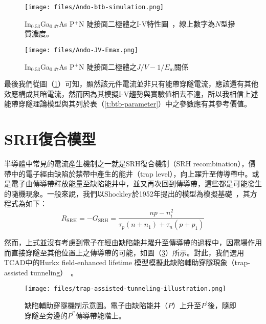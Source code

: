 \begin{figure}[h]
\centering
\texttt{[image: files/Ando-btb-simulation.png]}
\caption[In$_{0.53}$Ga$_{0.47}$As P$^+$N 陡接面二極體之I-V關係]{In$_{0.53}$Ga$_{0.47}$As P$^+$N 陡接面二極體之I-V特性圖~\cite{Ando:1980fn}，線上數字為$N$型摻質濃度。}
\label{fig:btb-IV}
\end{figure}
\begin{figure}[h]
\centering
\texttt{[image: files/Ando-JV-Emax.png]}
\caption{In$_{0.53}$Ga$_{0.47}$As P$^+$N 陡接面二極體之$J/V-1/E_\text{m}$關係}
\label{fig:btb-JV-Emax}
\end{figure}
最後我們從圖（\ref{fig:btb-IV}）可知，顯然該元件電流並非只有能帶穿隧電流，應該還有其他效應構成其暗電流，然而因為其模擬I-V趨勢與實驗值相去不遠，所以我相信上述能帶穿隧理論模型與其列於表（\ref{t:btb-parameter}）中之參數應有其參考價值。
\section{SRH復合模型}\label{cs:SRH-recombination}
半導體中常見的電流產生機制之一就是SRH復合機制（SRH recombination），價帶中的電子經由缺陷於禁帶中產生的能井（trap level），向上躍升至傳導帶中。或是電子由傳導帶釋放能量至缺陷能井中，並又再次回到傳導帶，這些都是可能發生的隨機現象。一般來說，我們以Shockley於1952年提出的模型為模擬基礎~\cite{shockley1952statistics}\cite{sentaurus2016sdevice}，其方程式為如下：
\begin{equation}\label{eq:srh-recombination-rate}
R_\text{SRH}=-G_\text{SRH}=\frac{np-n_i^2}{\tau_p(n+n_1)+\tau_n(p+p_1)}
\end{equation}

然而，上式並沒有考慮到電子在經由缺陷能井躍升至傳導帶的過程中，因電場作用而直接穿隧至其他位置上之傳導帶的可能，如圖（\ref{fig:tat-illustration}）所示。對此，我們選用TCAD中的Hurkx field-enhanced lifetime 模型模擬此缺陷輔助穿隧現象（trap-assisted tunneling）~\cite{hurkx1989modelling}\cite{sentaurus2016sdevice}。
\begin{figure}[h]
\centering
\texttt{[image: files/trap-assisted-tunneling-illustration.png]}
\caption[缺陷輔助穿隧機制示意圖(1)]{缺陷輔助穿隧機制示意圖。電子由缺陷能井（$P$）上升至$P^\prime$後，隨即穿隧至旁邊的$P^{\prime\prime}$傳導帶能階上。}
\label{fig:tat-illustration}
\end{figure}

